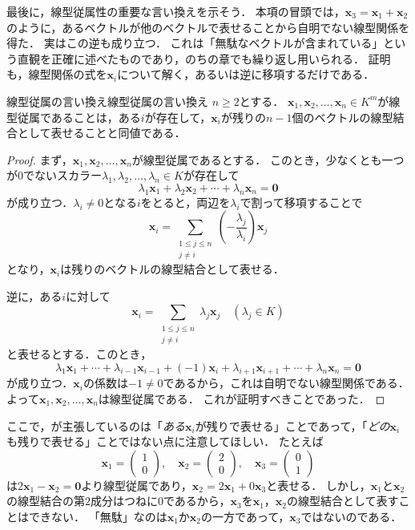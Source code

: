 最後に，線型従属性の重要な言い換えを示そう．
本項の冒頭では，$\bm{x}_3 = \bm{x}_1 + \bm{x}_2$のように，あるベクトルが他のベクトルで表せることから自明でない線型関係を得た．
実はこの逆も成り立つ．
これは「無駄なベクトルが含まれている」という直観を正確に述べたものであり，のちの章でも繰り返し用いられる．
証明も，線型関係の式を$\bm{x}_i$について解く，あるいは逆に移項するだけである．

\begin{prop}{線型従属の言い換え}{線型従属の言い換え}
  $n \ge 2$とする．
  $\bm{x}_1, \bm{x}_2, \dots, \bm{x}_n \in K^m$が線型従属であることは，ある$i$が存在して，$\bm{x}_i$が残りの$n - 1$個のベクトルの線型結合として表せることと同値である．
\end{prop}

\begin{tleftbar}
\begin{proof}
  まず，$\bm{x}_1, \bm{x}_2, \dots, \bm{x}_n$が線型従属であるとする．
  このとき，少なくとも一つが$0$でないスカラー$\lambda_1, \lambda_2, \dots, \lambda_n \in K$が存在して
  \[
    \lambda_1 \bm{x}_1 + \lambda_2 \bm{x}_2 + \cdots + \lambda_n \bm{x}_n = \bm{0}
  \]
  が成り立つ．$\lambda_i \ne 0$となる$i$をとると，両辺を$\lambda_i$で割って移項することで
  \[
    \bm{x}_i = \sum_{\substack{1 \le j \le n \\ j \ne i}} \left(-\frac{\lambda_j}{\lambda_i}\right) \bm{x}_j
  \]
  となり，$\bm{x}_i$は残りのベクトルの線型結合として表せる．

  逆に，ある$i$に対して
  \[
    \bm{x}_i = \sum_{\substack{1 \le j \le n \\ j \ne i}} \lambda_j \bm{x}_j
    \quad (\lambda_j \in K)
  \]
  と表せるとする．このとき，
  \[
    \lambda_1 \bm{x}_1 + \cdots + \lambda_{i-1} \bm{x}_{i-1} + (-1)\bm{x}_i + \lambda_{i+1} \bm{x}_{i+1} + \cdots + \lambda_n \bm{x}_n = \bm{0}
  \]
  が成り立つ．$\bm{x}_i$の係数は$-1 \ne 0$であるから，これは自明でない線型関係である．
  よって$\bm{x}_1, \bm{x}_2, \dots, \bm{x}_n$は線型従属である．
  これが証明すべきことであった．
\end{proof}
\end{tleftbar}

ここで，が主張しているのは「\emph{ある}$\bm{x}_i$が残りで表せる」ことであって，「\emph{どの}$\bm{x}_i$も残りで表せる」ことではない点に注意してほしい．
たとえば
\[
  \bm{x}_1 = \begin{pmatrix} 1 \\ 0 \end{pmatrix}, \quad
  \bm{x}_2 = \begin{pmatrix} 2 \\ 0 \end{pmatrix}, \quad
  \bm{x}_3 = \begin{pmatrix} 0 \\ 1 \end{pmatrix}
\]
は$2\bm{x}_1 - \bm{x}_2 = \bm{0}$より線型従属であり，$\bm{x}_2 = 2\bm{x}_1 + 0\bm{x}_3$と表せる．
しかし，$\bm{x}_1$と$\bm{x}_2$の線型結合の第$2$成分はつねに$0$であるから，$\bm{x}_3$を$\bm{x}_1$，$\bm{x}_2$の線型結合として表すことはできない．
「無駄」なのは$\bm{x}_1$か$\bm{x}_2$の一方であって，$\bm{x}_3$ではないのである．


